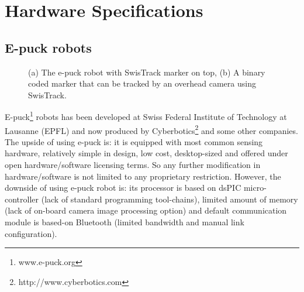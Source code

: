 \appendix
\appendixpage
\addappheadtotoc
\chapter{Hardware Specifications}
\section{E-puck robots}
\begin{figure}[htp]
\centering
{} 
\hspace{0.5cm}
\caption{(a) The e-puck robot with SwisTrack marker on top, (b) A binary coded marker that can be tracked by an overhead camera  using SwisTrack.}
\label{fig:e-puck}
\end{figure}
E-puck\footnote{www.e-puck.org} robots has been developed at Swiss Federal Institute of Technology at Lausanne (EPFL) and now produced by Cyberbotics\footnote{http://www.cyberbotics.com} and some other companies. The upside of using e-puck is: it is equipped with most common sensing hardware, relatively simple in design, low cost, desktop-sized and offered under open hardware/software licensing terms. So any further modification in hardware/software is not limited to any proprietary restriction. However, the downside of using e-puck robot is: its processor is based on dsPIC micro-controller (lack of standard programming tool-chains), limited amount of memory (lack of on-board camera image processing option) and default communication module is based-on Bluetooth (limited bandwidth and manual link configuration).

